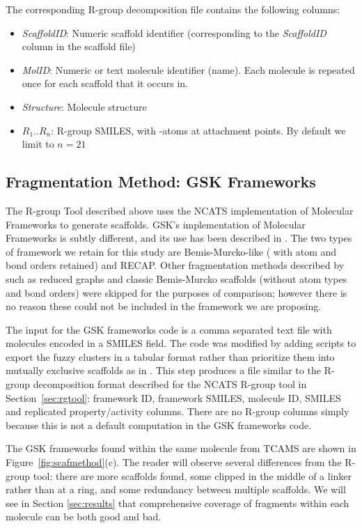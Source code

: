 \documentclass[journal=jacsat,manuscript=article]{achemso}
\newcommand*\fref[1]{Figure~\ref{fig:#1}}
\newcommand*\sref[1]{Section~\ref{sec:#1}}
\begin{document}
The corresponding R-group decomposition file contains the following columns:
\begin{itemize}
\item {\it ScaffoldID}: Numeric scaffold identifier (corresponding to
  the {\it ScaffoldID} column in the scaffold file)
\item {\it MolID}: Numeric or text molecule identifier (name). Each molecule is repeated once for each scaffold that it occurs in.\
\item {\it Structure}: Molecule structure
\item {\it $R_1..R_n$}: R-group SMILES, with \*-atoms at attachment
  points. By default we limit to $n = 21$
\end{itemize}

\subsection{Fragmentation Method: GSK Frameworks}
\label{sec:gskframe}
The R-group Tool described above uses the NCATS implementation of Molecular Frameworks to generate scaffolds. GSK's implementation of Molecular Frameworks is subtly different, and its use has been described in \citeauthor{Harper2004DDclus}. The two types of framework we retain for this study are Bemis-Murcko-like (\cite{BemisMurcko1996} with atom and bond orders retained) and RECAP\cite{Lewell:1998aa}. Other fragmentation methods described by \citeauthor{Harper2004DDclus} such as reduced graphs and classic Bemis-Murcko scaffolds (without atom types and bond orders) were skipped for the purposes of comparison; however there is no reason these could not be included in the framework we are proposing.    

The input for the GSK frameworks code is a comma separated text file
with molecules encoded in a SMILES field.  The code was modified by
adding scripts to export the fuzzy clusters in a tabular format rather
than prioritize them into mutually exclusive scaffolds as in
\citeauthor{Harper2004DDclus}. This step produces a file similar to
the R-group decomposition format described for the NCATS R-group tool
in \sref{rgtool}: framework ID, framework SMILES, molecule ID, SMILES
and replicated property/activity columns.  There are no R-group
columns simply because this is not a default computation in the GSK
frameworks code.

The GSK frameworks found within the same molecule from TCAMS are shown
in \fref{scafmethod}(c).  The reader will observe several differences
from the R-group tool: there are more scaffolds found, some clipped in
the middle of a linker rather than at a ring, and some redundancy
between multiple scaffolds. We will see in Section \ref{sec:results}
that comprehensive coverage of fragments within each molecule can be
both good and bad.
\end{document}
